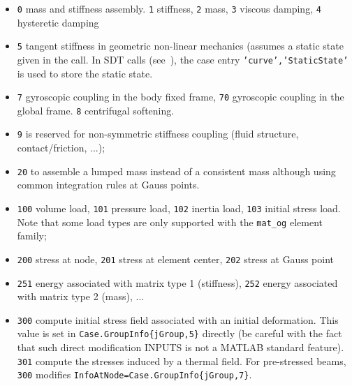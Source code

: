 \begin{itemize}
\item {\tt 0} mass and stiffness assembly.  {\tt 1} stiffness, {\tt 2} mass, {\tt 3} viscous damping,  {\tt 4} hysteretic damping 
\item {\tt 5} tangent stiffness in geometric non-linear mechanics (assumes a static state given in the call. In SDT calls (see~), the case entry {\tt 'curve','StaticState'} is used to store the static state.
\item {\tt 7} gyroscopic coupling in the body fixed frame, {\tt 70} gyroscopic coupling in the global frame. {\tt 8} centrifugal softening. 
\item {\tt 9} is reserved for non-symmetric stiffness coupling (fluid structure, contact/friction, ...);
\item {\tt 20} to assemble a lumped mass instead of a consistent mass although using common integration rules at Gauss points.
\item {\tt 100} volume load, {\tt 101} pressure load, {\tt 102} inertia load, {\tt 103} initial stress load. Note that some load types are only supported with the {\tt mat\_og} element family; 
\item {\tt 200} stress at node, {\tt 201} stress at element center, {\tt 202} stress at Gauss point
\item {\tt 251} energy associated with matrix type 1 (stiffness), {\tt 252} energy associated with matrix type 2 (mass), ...  
\item {\tt 300} compute initial stress field associated with an initial deformation. This value is set in {\tt Case.GroupInfo\{jGroup,5\}} directly (be careful with the fact that such direct modification INPUTS is not a MATLAB standard feature). {\tt 301} compute the stresses induced by a thermal field. For pre-stressed beams, {\tt 300} modifies  {\tt InfoAtNode=Case.GroupInfo\{jGroup,7\}}.

\end{itemize}

